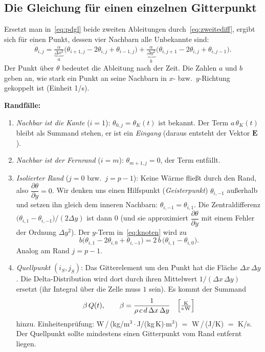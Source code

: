 \documentclass[11pt,a4paper]{article}
\numberwithin{equation}{section}
\newcommand{\pd}[2]{\dfrac{\partial #1}{\partial #2}}
\newcommand{\dx}{\Delta x}
\newcommand{\dy}{\Delta y}
\newcommand{\thK}{\theta_{K}}
\newcommand{\mE}{\mathbf{E}}
\begin{document}
\subsection{Die Gleichung für einen einzelnen Gitterpunkt}

Ersetzt man in~\eqref{eq:pdgl} beide zweiten Ableitungen durch~\eqref{eq:zweitediff}, ergibt sich für einen Punkt, dessen vier Nachbarn alle Unbekannte sind:
\begin{equation}
 \dot\theta_{i,j}=\underbrace{\tfrac{\alpha}{\dx^2}}_{a}\bigl(\theta_{i+1,j}-2\theta_{i,j}+\theta_{i-1,j}\bigr)
 +\underbrace{\tfrac{\alpha}{\dy^2}}_{b}\bigl(\theta_{i,j+1}-2\theta_{i,j}+\theta_{i,j-1}\bigr).
 \label{eq:knoten}
\end{equation}
Der Punkt über $\theta$ bedeutet die Ableitung nach der Zeit. Die Zahlen $a$ und $b$ geben an, wie stark ein Punkt an seine Nachbarn in $x$- bzw.\ $y$-Richtung gekoppelt ist (Einheit 1/s).

\textbf{Randfälle:}
\begin{enumerate}
 \item \emph{Nachbar ist die Kante} ($i=1$): $\theta_{0,j}=\thK(t)$ ist bekannt. Der Term $a\,\thK(t)$ bleibt als Summand stehen, er ist ein \emph{Eingang} (daraus entsteht der Vektor $\mE$).
 \item \emph{Nachbar ist der Fernrand} ($i=m$): $\theta_{m+1,j}=0$, der Term entfällt.
 \item \emph{Isolierter Rand} ($j=0$ bzw.\ $j=p-1$): Keine Wärme fließt durch den Rand, also $\pd{\theta}{y}=0$. Wir denken uns einen Hilfspunkt (\emph{Geisterpunkt}) $\theta_{i,-1}$ außerhalb und setzen ihn gleich dem inneren Nachbarn: $\theta_{i,-1}=\theta_{i,1}$. Die Zentraldifferenz $\bigl(\theta_{i,1}-\theta_{i,-1}\bigr)/(2\dy)$ ist dann $0$ (und sie approximiert $\pd{\theta}{y}$ mit einem Fehler der Ordnung $\dy^2$). Der $y$-Term in~\eqref{eq:knoten} wird zu
 \begin{equation}
  b\bigl(\theta_{i,1}-2\theta_{i,0}+\theta_{i,-1}\bigr)=2\,b\,\bigl(\theta_{i,1}-\theta_{i,0}\bigr).
 \end{equation}
 Analog am Rand $j=p-1$.
 \item \emph{Quellpunkt} $(i_S,j_S)$: Das Gitterelement um den Punkt hat die Fläche $\dx\,\dy$. Die Delta-Distribution wird dort durch ihren Mittelwert $1/(\dx\,\dy)$ ersetzt (ihr Integral über die Zelle muss $1$ sein). Es kommt der Summand
 \begin{equation}
  \beta\,Q(t),\qquad \beta=\frac{1}{\rho\,c\,d\,\dx\,\dy}\quad\Bigl[\tfrac{\mathrm K}{\mathrm s\,\mathrm W}\Bigr]
 \end{equation}
 hinzu. Einheitenprüfung: W\,/\,(kg/m$^3\cdot$J/(kg\,K)$\cdot$m$^3$) $=$ W\,/\,(J/K) $=$ K/s. Der Quellpunkt sollte mindestens einen Gitterpunkt vom Rand entfernt liegen.
\end{enumerate}
\end{document}
